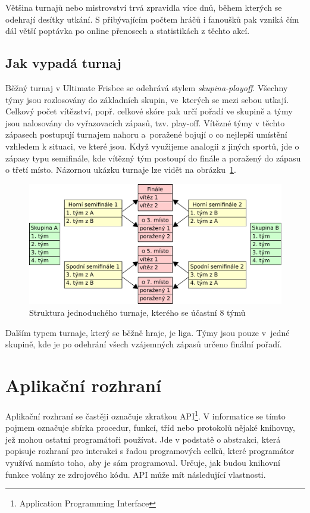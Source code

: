 Většina turnajů nebo mistrovství trvá zpravidla více dnů, během kterých se odehrají desítky
utkání. S přibývajícím počtem hráčů i fanoušků pak vzniká čím dál větší poptávka po online
přenosech a statistikách z těchto akcí.

\subsection{Jak vypadá turnaj}

Běžný turnaj v Ultimate Frisbee se odehrává stylem \textit{skupina-playoff}. Všechny týmy jsou rozlosovány do základních skupin,
ve~kterých se mezi sebou utkají. Celkový počet vítězství, popř. celkové skóre pak určí pořadí ve skupině a týmy
jsou nalosovány do vyřazovacích zápasů, tzv. play-off. Vítězné týmy v těchto zápasech postupují turnajem nahoru
a~poražené bojují o co nejlepší umístění vzhledem k situaci, ve které jsou. Když využijeme analogii z jiných sportů, jde o zápasy typu semifinále,
kde vítězný tým postoupí do finále a poražený do zápasu o třetí místo. Názornou ukázku turnaje lze vidět na obrázku~\ref{fig:tournament}.

\begin{figure}[ht!]
  \centering
  \includegraphics[width=130mm]{./images/turnaj.pdf}
  \caption{Struktura jednoduchého turnaje, kterého se účastní 8 týmů\label{overflow}}
  \label{fig:tournament}
\end{figure}

Dalším typem turnaje, který se běžně hraje, je liga. Týmy jsou pouze v~jedné skupině,
kde je po odehrání všech vzájemných zápasů určeno finální pořadí.

\section{Aplikační rozhraní}

Aplikační rozhraní se častěji označuje zkratkou API\footnote{Application Programming Interface}.
V informatice se tímto pojmem označuje sbírka procedur, funkcí, tříd
nebo protokolů nějaké knihovny, jež mohou ostatní programátoři používat.
Jde v podstatě o abstrakci, která popisuje rozhraní pro interakci s řadou programových celků,
které programátor využívá namísto toho, aby je sám programoval.
Určuje, jak budou knihovní funkce volány ze zdrojového kódu. API může mít následující vlastnosti.

